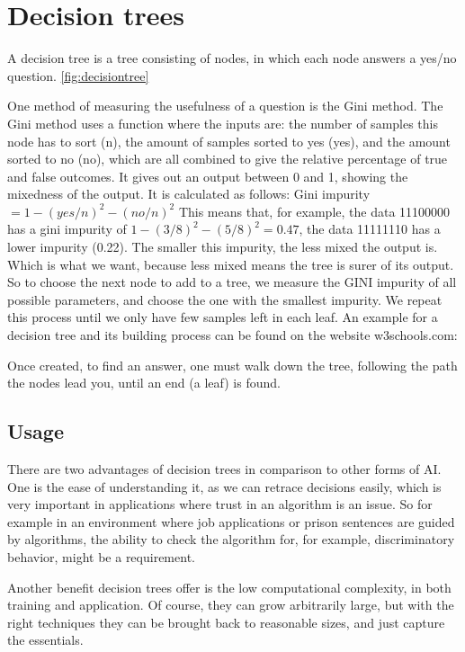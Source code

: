 \section{Decision trees}
\label{sec:decisionTrees}
A decision tree is a tree consisting of nodes, in which each node answers a yes/no question. \autoref{fig:decisiontree}

One method of measuring the usefulness of a question is the Gini method.
The Gini method uses a function where the inputs are: the number of samples this node has to sort (n), the amount of samples sorted to yes (yes), and the amount sorted to no (no), which are all combined to give the relative percentage of true and false outcomes. It gives out an output between 0 and 1, showing the mixedness of the output.
It is calculated as follows: Gini impurity $= 1-(yes/n)^2-(no/n)^2$ 
This means that, for example, the data 11100000 has a gini impurity of $1-(3/8)^2-(5/8)^2=0.47$, the data 11111110 has a lower impurity (0.22).
The smaller this impurity, the less mixed the output is. Which is what we want, because less mixed means the tree is surer of its output. 
So to choose the next node to add to a tree, we measure the GINI impurity of all possible parameters, and choose the one with the smallest impurity. We repeat this process until we only have few samples left in each leaf. 
An example for a decision tree and its building process can be found on the website w3schools.com:
\cite{decisiontree}

Once created, to find an answer, one must walk down the tree, following the path the nodes lead you, until an end (a leaf) is found.

\subsection{Usage}
There are two advantages of decision trees in comparison to other forms of AI. One is the ease of understanding it, as we can retrace decisions easily, which is very important in applications where trust in an algorithm is an issue. So for example in an environment where job applications or prison sentences are guided by algorithms, the ability to check the algorithm for, for example, discriminatory behavior, might be a requirement.

Another benefit decision trees offer is the low computational complexity, in both training and application. Of course, they can grow arbitrarily large, but with the right techniques they can be brought back to reasonable sizes, and just capture the essentials.

